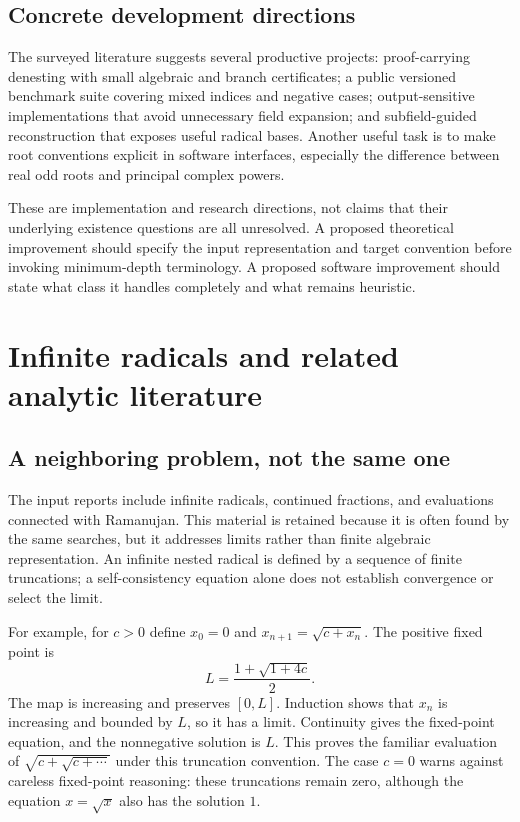 \documentclass[11pt,a4paper]{article}
\theoremstyle{definition}
\theoremstyle{remark}
\numberwithin{equation}{section}
\begin{document}
\subsection{Concrete development directions}

The surveyed literature suggests several productive projects: proof-carrying denesting with small algebraic and branch certificates; a public versioned benchmark suite covering mixed indices and negative cases; output-sensitive implementations that avoid unnecessary field expansion; and subfield-guided reconstruction that exposes useful radical bases. Another useful task is to make root conventions explicit in software interfaces, especially the difference between real odd roots and principal complex powers.

These are implementation and research directions, not claims that their underlying existence questions are all unresolved. A proposed theoretical improvement should specify the input representation and target convention before invoking minimum-depth terminology. A proposed software improvement should state what class it handles completely and what remains heuristic.

\section{Infinite radicals and related analytic literature}
\label{sec:infinite}

\subsection{A neighboring problem, not the same one}

The input reports include infinite radicals, continued fractions, and evaluations connected with Ramanujan. This material is retained because it is often found by the same searches, but it addresses limits rather than finite algebraic representation. An infinite nested radical is defined by a sequence of finite truncations; a self-consistency equation alone does not establish convergence or select the limit.\cite{herschfeld,borweindebarra,campbell,mitra}

For example, for $c>0$ define $x_0=0$ and $x_{n+1}=\sqrt{c+x_n}$. The positive fixed point is
\[
 L=\frac{1+\sqrt{1+4c}}2.
\]
The map is increasing and preserves $[0,L]$. Induction shows that $x_n$ is increasing and bounded by $L$, so it has a limit. Continuity gives the fixed-point equation, and the nonnegative solution is $L$. This proves the familiar evaluation of $\sqrt{c+\sqrt{c+\cdots}}$ under this truncation convention. The case $c=0$ warns against careless fixed-point reasoning: these truncations remain zero, although the equation $x=\sqrt{x}$ also has the solution $1$.
\end{document}
